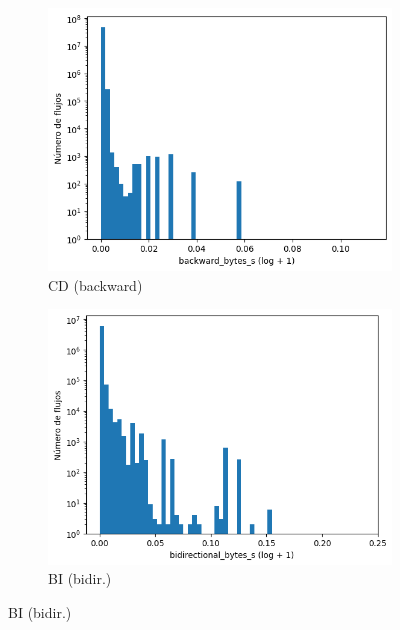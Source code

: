 \begin{figure}[H]
\begin{subfigure}[b]{0.26\textwidth}
        \includegraphics[width=\textwidth]{media/packet_pincer_cicddos/backward_bytes_s_log_x_log_y.png}
        \caption{CD (backward)}
    \end{subfigure}
    \hfill
    \begin{subfigure}[b]{0.26\textwidth}
        \centering
        \includegraphics[width=\linewidth]{media/packet_pincer_botiot/bidirectional_bytes_s_log_x_log_y.png}
        \caption{BI (bidir.)}

\end{subfigure}
\end{figure}
